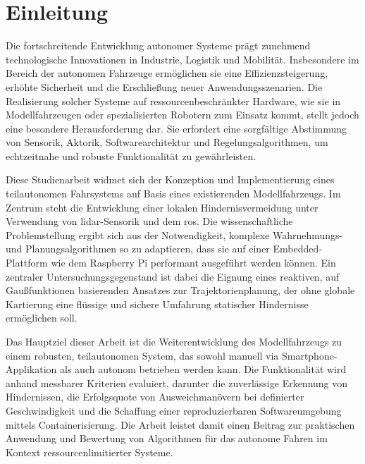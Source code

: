 \section{Einleitung}
\label{sec:einleitung}

Die fortschreitende Entwicklung autonomer Systeme prägt zunehmend technologische Innovationen in Industrie, Logistik und Mobilität. Insbesondere im Bereich der autonomen Fahrzeuge ermöglichen sie eine Effizienzsteigerung, erhöhte Sicherheit und die Erschließung neuer Anwendungsszenarien. Die Realisierung solcher Systeme auf ressourcenbeschränkter Hardware, wie sie in Modellfahrzeugen oder spezialisierten Robotern zum Einsatz kommt, stellt jedoch eine besondere Herausforderung dar. Sie erfordert eine sorgfältige Abstimmung von Sensorik, Aktorik, Softwarearchitektur und Regelungsalgorithmen, um echtzeitnahe und robuste Funktionalität zu gewährleisten.

Diese Studienarbeit widmet sich der Konzeption und Implementierung eines teilautonomen Fahrsystems auf Basis eines existierenden Modellfahrzeugs. Im Zentrum steht die Entwicklung einer lokalen Hindernisvermeidung unter Verwendung von \gls{lidar}-Sensorik und dem \gls{ros}. Die wissenschaftliche Problemstellung ergibt sich aus der Notwendigkeit, komplexe Wahrnehmungs- und Planungsalgorithmen so zu adaptieren, dass sie auf einer Embedded-Plattform wie dem Raspberry Pi performant ausgeführt werden können. Ein zentraler Untersuchungsgegenstand ist dabei die Eignung eines reaktiven, auf Gaußfunktionen basierenden Ansatzes zur Trajektorienplanung, der ohne globale Kartierung eine flüssige und sichere Umfahrung statischer Hindernisse ermöglichen soll.

Das Hauptziel dieser Arbeit ist die Weiterentwicklung des Modellfahrzeugs zu einem robusten, teilautonomen System, das sowohl manuell via Smartphone-Applikation als auch autonom betrieben werden kann. Die Funktionalität wird anhand messbarer Kriterien evaluiert, darunter die zuverlässige Erkennung von Hindernissen, die Erfolgsquote von Ausweichmanövern bei definierter Geschwindigkeit und die Schaffung einer reproduzierbaren Softwareumgebung mittels Containerisierung. Die Arbeit leistet damit einen Beitrag zur praktischen Anwendung und Bewertung von Algorithmen für das autonome Fahren im Kontext ressourcenlimitierter Systeme.